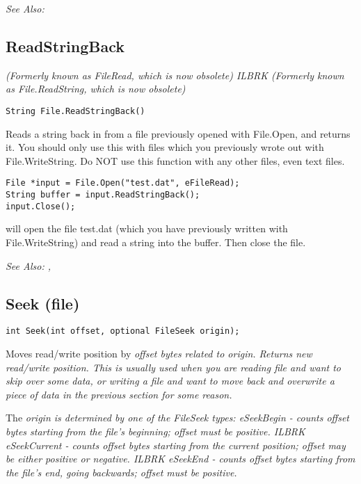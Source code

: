 \it{See Also:} 


\subsection{ReadStringBack}\label{File.ReadStringBack}%

\it{(Formerly known as FileRead, which is now obsolete)} ILBRK
\it{(Formerly known as File.ReadString, which is now obsolete)}

\begin{verbatim}
String File.ReadStringBack()
\end{verbatim}
Reads a string back in from a file previously opened with File.Open, and returns it.
You should only use this with files which you previously wrote out with
File.WriteString. Do NOT use this function with any other files, even text files.

\begin{verbatim}
File *input = File.Open("test.dat", eFileRead);
String buffer = input.ReadStringBack();
input.Close();
\end{verbatim}
will open the file test.dat (which you have previously written with File.WriteString) and
read a string into the buffer. Then close the file.

\it{See Also:} , 


\subsection{Seek (file)}\label{File.Seek}%

\begin{verbatim}
int Seek(int offset, optional FileSeek origin);
\end{verbatim}
Moves read/write position by \it{offset} bytes related to \it{origin}. Returns new read/write position.
This is usually used when you are reading file and want to skip over some data, or writing a file
and want to move back and overwrite a piece of data in the previous section for some reason.

The \it{origin} is determined by one of the FileSeek types:
eSeekBegin - counts \it{offset} bytes starting from the file's beginning; \it{offset} must be positive. ILBRK
eSeekCurrent - counts \it{offset} bytes starting from the current position; \it{offset} may be either
positive or negative. ILBRK
eSeekEnd - counts \it{offset} bytes starting from the file's end, going backwards; \it{offset} must be positive.

